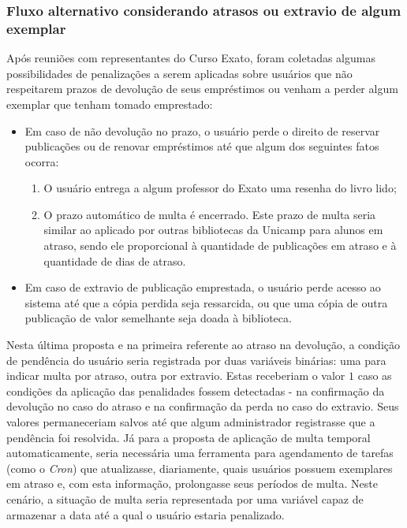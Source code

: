 \documentclass[a4paper]{article}
\begin{document}
\subsubsection{Fluxo alternativo considerando atrasos ou extravio de algum exemplar}
Após reuniões com representantes do Curso Exato, foram coletadas algumas possibilidades de penalizações a serem aplicadas sobre usuários que não respeitarem prazos de devolução de seus empréstimos ou venham a perder algum exemplar que tenham tomado emprestado:

\begin{itemize}
\item Em caso de não devolução no prazo, o usuário perde o direito de reservar publicações ou de renovar empréstimos até que algum dos seguintes fatos ocorra:
\begin{enumerate}
\item O usuário entrega a algum professor do Exato uma resenha do livro lido;
\item O prazo automático de multa é encerrado. Este prazo de multa seria similar ao aplicado por outras bibliotecas da Unicamp para alunos em atraso, sendo ele proporcional à quantidade de publicações em atraso e à quantidade de dias de atraso.
\end{enumerate}
\item Em caso de extravio de publicação emprestada, o usuário perde acesso ao sistema até que a cópia perdida seja ressarcida, ou que uma cópia de outra publicação de valor semelhante seja doada à biblioteca.
\end{itemize}

Nesta última proposta e na primeira referente ao atraso na devolução, a condição de pendência do usuário seria registrada por duas variáveis binárias: uma para indicar multa por atraso, outra por extravio. Estas receberiam o valor $1$ caso as condições da aplicação das penalidades fossem detectadas - na confirmação da devolução no caso do atraso e na confirmação da perda no caso do extravio. Seus valores permaneceriam salvos até que algum administrador registrasse que a pendência foi resolvida. Já para a proposta de aplicação de multa temporal automaticamente, seria necessária uma ferramenta para agendamento de tarefas (como o \textit{Cron}) que atualizasse, diariamente, quais usuários possuem exemplares em atraso e, com esta informação, prolongasse seus períodos de multa. Neste cenário, a situação de multa seria representada por uma variável capaz de armazenar a data até a qual o usuário estaria penalizado.
\end{document}
